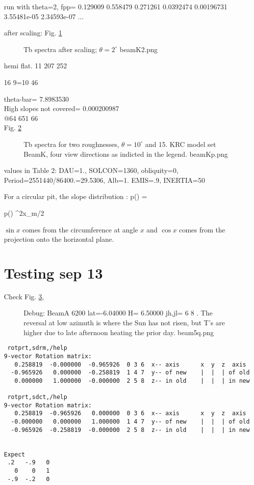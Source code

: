 \documentclass{article}
\begin{document}
run with theta=2, fpp=  0.129009     0.558479     0.271261    0.0392474   0.00196731  3.55481e-05  2.34593e-07 ...

after scaling: Fig.
\ref{beamK2}
\begin{figure}[!ht] 
\caption[nill slope]{Tb spectra after scaling; $\theta=2^\circ$
\label{beamK2}  beamK2.png  }
\end{figure} 

hemi flat.  11 207 252 

16 9=10 46 

theta-bar=       7.8983530
\\ High slopes not covered=  0.000200987
\\ @64 651 66
\\ Fig. \ref{beamKp}
\begin{figure}[!ht] 
\caption[Two slopes]{Tb spectra for two roughnesses, $\theta = 10^\circ$ and 15\qd. KRC model set BeamK, four view directions as indicted in the legend.
\label{beamKp}  beamKp.png  }
\end{figure} 

  values in Table 2: DAU=1., SOLCON=1360, obliquity=0, Period=2551440/86400.=29.5306, Alb=1. EMIS=.9, INERTIA=50

For a circular pit, the slope distribution :
\qbn  p(\theta) =  \qen

\qbn  p(\theta)  {\sin^2x_m/2} \qen

$\sin x$ comes from the circumference at angle $x$ and  $\cos x$ comes from the projection onto the horizontal plane.

\section{Testing sep 13}

Check Fig. \ref{beam5q}, 
\begin{figure}[!ht] 
\caption[Ts vrs azimuth]{Debug: BeamA 6200 lat=-6.04000 H= 6.50000 jh,jl= 6 8 .
  The reversal at low azimuth is where the Sun has not risen, but T's are higher
  due to late afternoon heating the prior day.
\label{beam5q}  beam5q.png }
\end{figure} 

\begin{verbatim}
 rotprt,sdrm,/help
9-vector Rotation matrix:  
   0.258819  -0.000000  -0.965926  0 3 6  x-- axis      x  y  z  axis
  -0.965926   0.000000  -0.258819  1 4 7  y-- of new    |  |  | of old
   0.000000   1.000000  -0.000000  2 5 8  z-- in old    |  |  | in new

 rotprt,sdct,/help
9-vector Rotation matrix:  
   0.258819  -0.965926   0.000000  0 3 6  x-- axis      x  y  z  axis
  -0.000000   0.000000   1.000000  1 4 7  y-- of new    |  |  | of old
  -0.965926  -0.258819  -0.000000  2 5 8  z-- in old    |  |  | in new


Expect      
 .2   -.9   0    
   0    0   1 
 -.9  -.2   0

\end{verbatim} 
\end{document}
